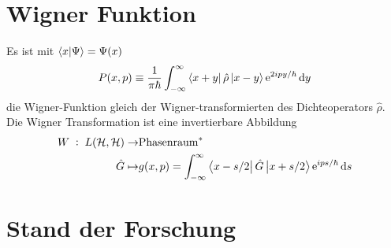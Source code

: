 \section{Wigner Funktion}
\label{sec:wignerfunktion}
Es ist mit $\bra{x}\ket{\Psi} = \Psi(x)$
\begin{equation}
  P(x,p) \equiv \frac{1}{\pi\hbar} \int_{-\infty}^{\infty} \bra{x+y}\hat{\rho} \ket{x-y} \text{e}^{2ipy/\hbar} \mathop{}\!\mathrm{d} y
\end{equation}
die Wigner-Funktion gleich der Wigner-transformierten des Dichteoperators $\hat{\rho}$. Die Wigner Transformation ist eine invertierbare Abbildung
\begin{align}
  W\; :\; L(\mathcal{H},\mathcal{H})  \rightarrow & \text{Phasenraum}^* \\
   \hat{G} \mapsto & g(x,p) = \int_{-\infty}^{\infty} \bra{x-s/2}\hat{G} \ket{x+s/2} \text{e}^{ips/\hbar} \mathop{}\!\mathrm{d} s
\end{align}

\section{Stand der Forschung}

